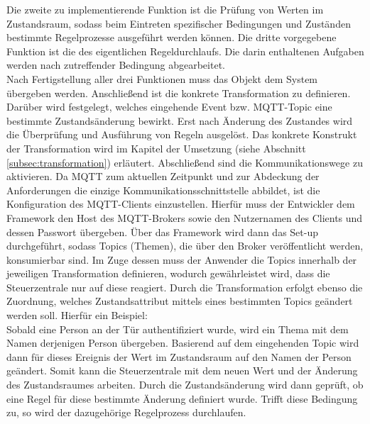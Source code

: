         Die zweite zu implementierende Funktion ist die Prüfung von Werten im Zustandsraum, sodass beim Eintreten spezifischer 
        Bedingungen und Zuständen bestimmte Regelprozesse ausgeführt werden können. Die dritte vorgegebene Funktion ist die 
        des eigentlichen Regeldurchlaufs. Die darin enthaltenen Aufgaben werden nach zutreffender Bedingung abgearbeitet.
        \\
        Nach Fertigstellung aller drei Funktionen muss das Objekt dem System übergeben werden. Anschließend ist die 
        konkrete Transformation zu definieren. Darüber wird festgelegt, welches eingehende Event bzw. \acs{MQTT}-Topic 
        eine bestimmte Zustandsänderung bewirkt. Erst nach Änderung des Zustandes wird die Überprüfung und Ausführung 
        von Regeln ausgelöst. Das konkrete Konstrukt der Transformation wird im Kapitel der Umsetzung (siehe Abschnitt \ref{subsec:transformation}) 
        erläutert. Abschließend sind die Kommunikationswege zu aktivieren. 
        Da \acs{MQTT} zum aktuellen Zeitpunkt und zur Abdeckung der Anforderungen die einzige Kommunikationsschnittstelle 
        abbildet, ist die Konfiguration des \acs{MQTT}-Clients einzustellen. Hierfür muss der Entwickler 
        dem Framework den Host des \acs{MQTT}-Brokers sowie den Nutzernamen des Clients und dessen Passwort übergeben. Über das 
        Framework wird dann das Set-up durchgeführt, sodass Topics (Themen), die über den Broker veröffentlicht werden, konsumierbar 
        sind. Im Zuge dessen muss der Anwender die Topics innerhalb der jeweiligen Transformation definieren, wodurch gewährleistet wird, dass 
        die Steuerzentrale nur auf diese reagiert. Durch die Transformation erfolgt ebenso die 
        Zuordnung, welches Zustandsattribut mittels eines bestimmten Topics geändert werden soll. Hierfür ein Beispiel:  
        \\
        \linebreak
        Sobald eine Person an der Tür authentifiziert wurde, wird ein Thema mit dem Namen derjenigen Person übergeben. Basierend auf 
        dem eingehenden Topic wird dann für dieses Ereignis der Wert im Zustandsraum auf den Namen der Person geändert. Somit kann 
        die Steuerzentrale mit dem neuen Wert und der Änderung des Zustandsraumes arbeiten. Durch die Zustandsänderung wird dann 
        geprüft, ob eine Regel für diese bestimmte Änderung definiert wurde. Trifft diese Bedingung zu, so wird der dazugehörige Regelprozess 
        durchlaufen.  
        \\
        \linebreak
